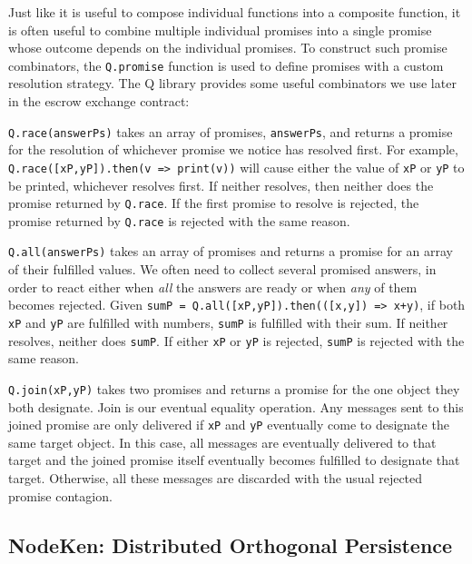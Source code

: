 \documentclass{llncs}
\begin{document}
Just like it is useful to compose individual functions into a composite function, it is often useful to combine multiple individual promises into a single promise whose outcome depends on the individual promises. To construct such promise combinators, the {\tt Q.promise} function is used to define promises with a custom resolution strategy. The Q library provides some useful combinators we use later in the escrow exchange contract:

\begin{description*}
\item[{\tt Q.race(answerPs)}] takes an array of promises, {\tt answerPs}, and returns a promise for the resolution of whichever promise we notice has resolved first. For example, {\tt Q.race([xP,yP]).then(v => print(v))} will cause either the value of {\tt xP} or {\tt yP} to be printed, whichever resolves first. If neither resolves, then neither does the promise returned by {\tt Q.race}. If the first promise to resolve is rejected, the promise returned by {\tt Q.race} is rejected with the same reason.

\item[{\tt Q.all(answerPs)}] takes an array of promises and returns a promise for an array of their fulfilled values. We often need to collect several promised answers, in order to react either when \emph{all} the answers are ready or when \emph{any} of them becomes rejected. Given {\tt sumP = Q.all([xP,yP]).then(([x,y]) => x+y)}, if both {\tt xP} and {\tt yP} are fulfilled with numbers, {\tt sumP} is fulfilled with their sum. If neither resolves, neither does {\tt sumP}. If either {\tt xP} or {\tt yP} is rejected, {\tt sumP} is rejected with the same reason.

\item[{\tt Q.join(xP,yP)}] takes two promises and returns a promise for the one object they both designate. Join is our eventual equality operation. Any messages sent to this joined promise are only delivered if {\tt xP} and {\tt yP} eventually come to designate the same target object. In this case, all messages are eventually delivered to that target and the joined promise itself eventually becomes fulfilled to designate that target. Otherwise, all these messages are discarded with the usual rejected promise contagion.
\end{description*}


\subsection{NodeKen: Distributed Orthogonal Persistence}
\end{document}
